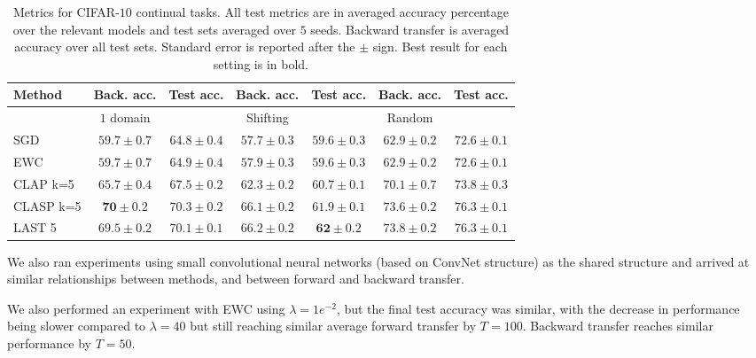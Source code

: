 \documentclass{article}
\theoremstyle{plain}
\theoremstyle{definition}
\theoremstyle{remark}
\begin{document}
\begin{table}[ht!]
\caption{Metrics for CIFAR-$10$ continual tasks. All test metrics are in averaged accuracy percentage over the relevant models and test sets averaged over $5$ seeds. Backward transfer is averaged accuracy over all test sets. Standard error is reported after the $\pm$ sign. Best result for each setting is in bold.}
\label{cifar-full-table}
\vskip 0.15in
\begin{center}
\begin{small}
\begin{sc}
\begin{tabular}{lcccccc}
\toprule
Method & Back. acc. & Test acc. & Back. acc. & Test acc. & Back. acc. & Test acc. \\
\midrule
 & $1$ domain  &  & Shifting & & Random & \\
\midrule
SGD    & $59.7\pm 0.7$ & $64.8\pm 0.4$ & $57.7\pm 0.3$ & $59.6\pm 0.3$ & $62.9\pm 0.2$ & $72.6\pm 0.1$  \\
EWC & $59.7\pm 0.7$ & $64.9\pm 0.4$ & $57.9\pm 0.3$ & $59.6\pm 0.3$ & $62.9\pm 0.2$ & $72.6\pm 0.1$ \\
CLAP k=5  & $65.7 \pm 0.4$ & $67.5 \pm 0.2$ &  $62.3 \pm 0.2$ & $60.7 \pm 0.1$  & $70.1 \pm 0.7$ & $73.8 \pm 0.3$  \\
CLASP k=5    & $\mathbf{70} \pm 0.2$& $\mathbf{70.3} \pm 0.2$  & $66.1 \pm 0.2$& $61.9 \pm 0.1$ & $73.6 \pm 0.2$& $\mathbf{76.3} \pm 0.1$    \\
LAST 5    & $69.5\pm 0.2$& $70.1\pm 0.1$ & $\mathbf{66.2}\pm 0.2$& $\mathbf{62}\pm 0.2$ & $\mathbf{73.8}\pm 0.2$& $\mathbf{76.3}\pm 0.1$   \\
%
\bottomrule
\end{tabular}
\end{sc}
\end{small}
\end{center}
\vskip -0.1in
\end{table}

We also ran experiments using small convolutional neural networks (based on ConvNet structure) as the shared structure and arrived at similar relationships between methods, and between forward and backward transfer.

We also performed an experiment with EWC using $\lambda=1e^{-2}$, but the final test accuracy was similar, with the decrease in performance being slower compared to $\lambda=40$ but still reaching similar average forward transfer by $T=100$. Backward transfer reaches similar performance by $T=50$.
\end{document}
